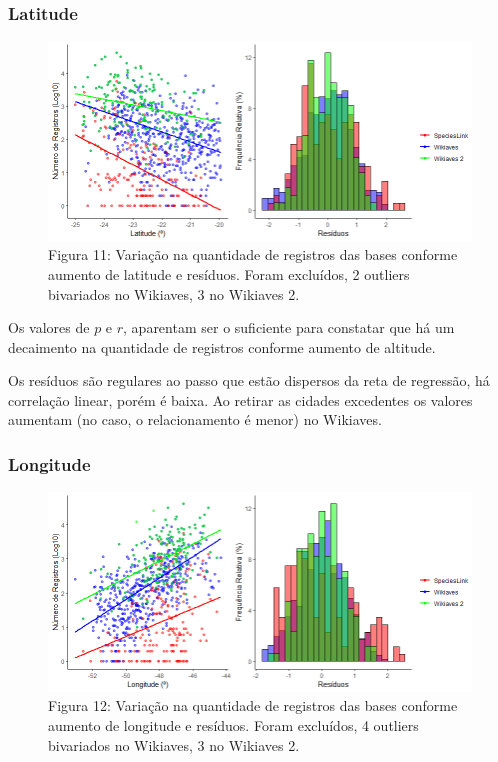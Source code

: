 \documentclass[12pt]{extarticle}
\newenvironment{resposta}{ \color{mygray}}{}
\begin{document}
\subsubsection{Latitude}

\begin{figure}[h!]
\centering
\includegraphics[width = 15cm]{Imagens/G04.png}
\\{\scriptsize Figura 11: Variação na quantidade de registros das bases conforme aumento de latitude e resíduos. Foram excluídos, 2 outliers bivariados no Wikiaves, 3 no Wikiaves 2.}
\end{figure}

\newpage

\begin{resposta}
 Os valores de $p$ e $r$, aparentam ser o suficiente para constatar que há um decaimento na quantidade de registros conforme aumento de altitude. 
 
 Os resíduos são regulares ao passo que estão dispersos da reta de regressão, há correlação linear, porém é baixa. Ao retirar as cidades excedentes os valores aumentam (no caso, o relacionamento é menor) no Wikiaves.
\end{resposta}

\subsubsection{Longitude}

\begin{figure}[h!]
\centering
\includegraphics[width = 15cm]{Imagens/G05.png}
\\{\scriptsize Figura 12: Variação na quantidade de registros das bases conforme aumento de longitude e resíduos. Foram excluídos, 4 outliers bivariados no Wikiaves, 3 no Wikiaves 2.}
\end{figure}
\end{document}

